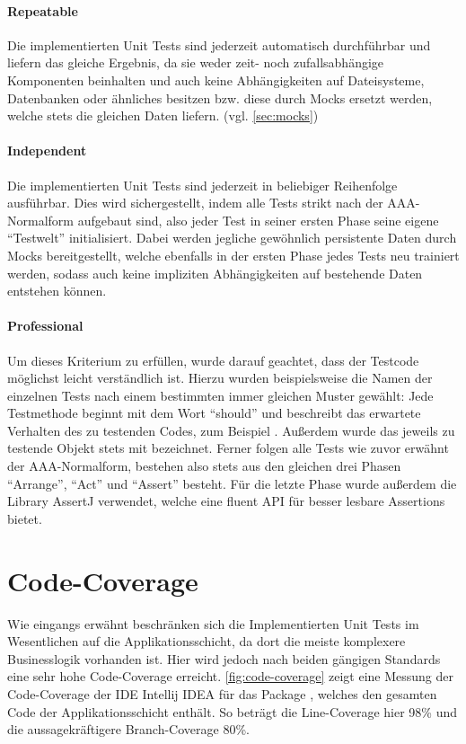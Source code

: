 \paragraph{Repeatable} Die implementierten Unit Tests sind jederzeit automatisch durchführbar und liefern das gleiche Ergebnis, da sie weder zeit- noch zufallsabhängige Komponenten beinhalten und auch keine Abhängigkeiten auf Dateisysteme, Datenbanken oder ähnliches besitzen bzw. diese durch Mocks ersetzt werden, welche stets die gleichen Daten liefern. (vgl. \autoref{sec:mocks})

\paragraph{Independent} Die implementierten Unit Tests sind jederzeit in beliebiger Reihenfolge ausführbar. Dies wird sichergestellt, indem alle Tests strikt nach der AAA-Normalform aufgebaut sind, also jeder Test in seiner ersten Phase seine eigene \enquote{Testwelt} initialisiert. Dabei werden jegliche gewöhnlich persistente Daten durch Mocks bereitgestellt, welche ebenfalls in der ersten Phase jedes Tests neu trainiert werden, sodass auch keine impliziten Abhängigkeiten auf bestehende Daten entstehen können.

\paragraph{Professional} Um dieses Kriterium zu erfüllen, wurde darauf geachtet, dass der Testcode möglichst leicht verständlich ist. Hierzu wurden beispielsweise die Namen der einzelnen Tests nach einem bestimmten immer gleichen Muster gewählt: Jede Testmethode beginnt mit dem Wort \enquote{should} und beschreibt das erwartete Verhalten des zu testenden Codes, zum Beispiel . Außerdem wurde das jeweils zu testende Objekt stets mit  bezeichnet. Ferner folgen alle Tests wie zuvor erwähnt der AAA-Normalform, bestehen also stets aus den gleichen drei Phasen \enquote{Arrange}, \enquote{Act} und \enquote{Assert} besteht. Für die letzte Phase wurde außerdem die Library AssertJ verwendet, welche eine fluent \ac{API} für besser lesbare Assertions bietet.

\section{Code-Coverage}
\label{sec:code-coverage}
Wie eingangs erwähnt beschränken sich die Implementierten Unit Tests im Wesentlichen auf die Applikationsschicht, da dort die meiste komplexere Businesslogik vorhanden ist. Hier wird jedoch nach beiden gängigen Standards eine sehr hohe Code-Coverage erreicht. \autoref{fig:code-coverage} zeigt eine Messung der Code-Coverage der IDE Intellij IDEA für das Package , welches den gesamten Code der Applikationsschicht enthält. So beträgt die Line-Coverage hier 98\% und die aussagekräftigere Branch-Coverage 80\%.

